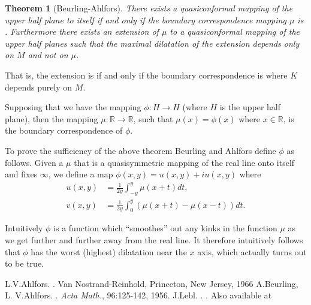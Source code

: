\documentclass[12pt]{article}
\theoremstyle{theorem}
\newtheorem*{thm}{Theorem}
\theoremstyle{definition}
\begin{document}
\begin{thm}[Beurling-Ahlfors]
There exists a quasiconformal mapping of the upper half plane to itself if and only if the boundary correspondence mapping $\mu$ is .  Furthermore there exists an extension of $\mu$ to a quasiconformal mapping of the upper half planes such that the maximal dilatation of the extension depends only on $M$ and not on $\mu$.
\end{thm}

That is, the extension is  if and only if the boundary correspondence is  where $K$ depends purely on $M$.

Supposing that we have the mapping $\phi: H \rightarrow H$ (where $H$ is the upper half plane), then the mapping $\mu : {\mathbb{R}} \rightarrow {\mathbb{R}}$,
such that $\mu(x) = \phi(x)$ where $x \in {\mathbb{R}}$, is the boundary correspondence of $\phi$.

To prove the sufficiency of the above theorem Beurling and Ahlfors \cite{ba1956} define $\phi$ as follows.  Given a $\mu$ that is a quasisymmetric mapping of the real line onto itself and fixes $\infty$, we define a map $\phi(x,y) = u(x,y) + iu(x,y)$ where
\begin{align*}
u(x,y) & = \frac{1}{2y} \int_{-y}^y \mu(x+t) dt ,
\\
v(x,y) & = \frac{1}{2y} \int_0^y (\mu(x+t) - \mu(x-t)) dt .
\end{align*}

Intuitively $\phi$ is a function which ``smoothes'' out any kinks in the function $\mu$ as we get further and further away from the real line.  It therefore intuitively follows that $\phi$ has the worst (highest) dilatation near the $x$ axis, which actually turns out to be true.

\begin{thebibliography}{9}
L.\@ V.\@ Ahlfors.  \emph{}.  Van Nostrand-Reinhold, Princeton, New Jersey, 1966
A.\@ Beurling, L\@. V.\@ Ahlfors.  .  \emph{Acta Math.}, 96:125-142,
1956.
J.\@ Lebl.  \emph{}.  .  Also available at
\end{thebibliography}
\end{document}
